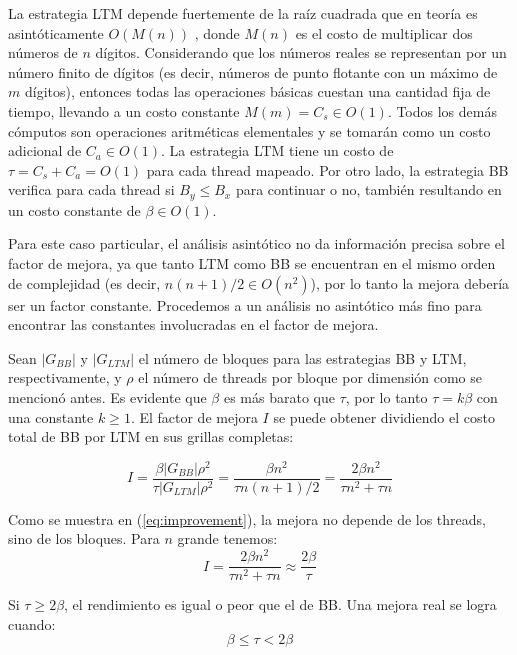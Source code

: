 \documentclass[twocolumn,10pt,a4paper]{article}
\begin{document}
La estrategia LTM depende fuertemente de la raíz cuadrada que en teoría es
asintóticamente $O(M(n))$ \cite{ref18}, donde $M(n)$ es el costo de
multiplicar dos números de $n$ dígitos. Considerando que los números reales se
representan por un número finito de dígitos (es decir, números de punto
flotante con un máximo de $m$ dígitos), entonces todas las operaciones básicas
cuestan una cantidad fija de tiempo, llevando a un costo constante
$M(m) = C_s \in O(1)$. Todos los demás cómputos son operaciones aritméticas
elementales y se tomarán como un costo adicional de $C_a \in O(1)$. La
estrategia LTM tiene un costo de $\tau = C_s + C_a = O(1)$ para cada thread
mapeado. Por otro lado, la estrategia BB verifica para cada thread si
$B_y \leq B_x$ para continuar o no, también resultando en un costo constante
de $\beta \in O(1)$.

Para este caso particular, el análisis asintótico no da información precisa
sobre el factor de mejora, ya que tanto LTM como BB se encuentran en el mismo
orden de complejidad (es decir, $n(n+1)/2 \in O(n^2)$), por lo tanto la
mejora debería ser un factor constante. Procedemos a un análisis no asintótico
más fino para encontrar las constantes involucradas en el factor de mejora.

Sean $|G_{BB}|$ y $|G_{LTM}|$ el número de bloques para las estrategias BB y
LTM, respectivamente, y $\rho$ el número de threads por bloque por dimensión
como se mencionó antes. Es evidente que $\beta$ es más barato que $\tau$, por
lo tanto $\tau = k\beta$ con una constante $k \geq 1$. El factor de mejora $I$
se puede obtener dividiendo el costo total de BB por LTM en sus grillas
completas:

\begin{equation}
I = \frac{\beta |G_{BB}| \rho^2}{\tau |G_{LTM}| \rho^2} =
    \frac{\beta n^2}{\tau n(n+1)/2} =
    \frac{2\beta n^2}{\tau n^2 + \tau n}
\label{eq:improvement}
\end{equation}

Como se muestra en (\ref{eq:improvement}), la mejora no depende de los
threads, sino de los bloques. Para $n$ grande tenemos:
\begin{equation}
I = \frac{2\beta n^2}{\tau n^2 + \tau n} \approx \frac{2\beta}{\tau}
\label{eq:improvement_large}
\end{equation}

Si $\tau \geq 2\beta$, el rendimiento es igual o peor que el de BB.
Una mejora real se logra cuando:
\begin{equation}
\beta \leq \tau < 2\beta
\label{eq:real_improvement}
\end{equation}
\end{document}
